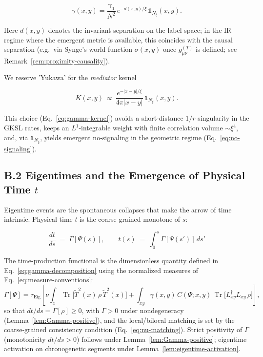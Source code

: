 \documentclass[12pt,a4paper]{article}
\renewcommand{\Tr}{\operatorname{Tr}}
\numberwithin{equation}{section}
\begin{document}
\vspace{0.5cm}

\[
\gamma(x,y)=\frac{\gamma_0}{N^2}\,e^{-d(x,y)/\xi}\,\mathbb{1}_{N_\xi}(x,y).
\]

\noindent Here $d(x,y)$ denotes the invariant separation on the label-space; in the IR regime where the emergent metric is available, this coincides with the causal separation
(e.g.\ via Synge's world function $\sigma(x,y)$ once $g^{(T)}_{\mu\nu}$ is defined; see Remark~\ref{rem:proximity-causality}).

\vspace{0.5cm}
\noindent We reserve 'Yukawa' for the \emph{mediator} kernel

\vspace{0.5cm}
\[
K(x,y)\ \propto\ \frac{e^{-|x-y|/\xi}}{4\pi |x-y|}\,\mathbb{1}_{N_\xi}(x,y).
\]

\vspace{0.5cm}

\noindent This choice (Eq.~\eqref{eq:gamma-kernel}) avoids a short-distance $1/r$ singularity in the GKSL rates, keeps an $L^1$-integrable weight with finite correlation volume $\sim\xi^4$, and, via $\mathbb{1}_{N_\xi}$, yields emergent no-signaling in the geometric regime (Eq.~\eqref{eq:no-signaling}). 

\vspace{0.8cm}

\subsection*{B.2 Eigentimes and the Emergence of Physical Time $t$}

\vspace{0.5cm}

Eigentime events are the spontaneous collapses that make the arrow of time intrinsic. Physical time $t$ is the coarse‑grained monotone of $s$:

\vspace{0.5cm}

\[
\frac{dt}{ds} \;=\; \Gamma[\Psi(s)],
\qquad
t(s) \;=\; \int_0^{s} \Gamma[\Psi(s')]\,ds'
\]

\vspace{0.5cm}

\noindent The time-production functional is the dimensionless quantity defined in
Eq.~\eqref{eq:gamma-decomposition} using the normalized measures of Eq.~\eqref{eq:measure-conventions}:
\[
\Gamma[\Psi] = \tau_{\mathrm{Eig}} \left[
\nu \int_x \Tr\bigl[\tilde{T}^2(x)\,\rho\,\tilde{T}^2(x)\bigr]
+ \int_{xy} \gamma(x,y)\,C(\Psi;x,y)\,\Tr\bigl[L_{xy}^\dagger L_{xy}\,\rho\bigr]
\right],
\]
so that $dt/ds=\Gamma[\rho]\ge 0$, with $\Gamma>0$ under nondegeneracy (Lemma~\ref{lem:Gamma-positive}), and the local/bilocal matching is set by the coarse‑grained consistency condition (Eq.~\eqref{eq:nu-matching}). Strict positivity of $\Gamma$ (monotonicity $dt/ds>0$) follows under Lemma~\ref{lem:Gamma-positive}; eigentime activation on chronogenetic segments under Lemma~\ref{lem:eigentime-activation}.
\end{document}

